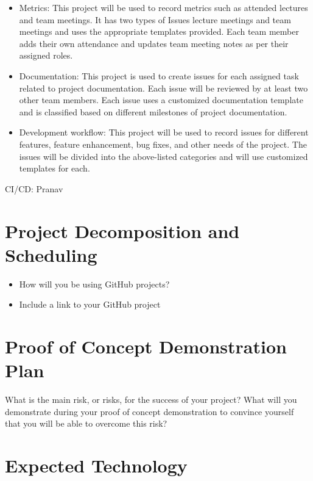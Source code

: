 \documentclass{article}
\begin{document}
\begin{itemize}
\item Metrics: This project will be used to record metrics such as attended lectures and team meetings. It has two types of Issues lecture meetings and team meetings and uses the appropriate templates provided. Each team member adds their own attendance and updates team meeting notes as per their assigned roles.
\item Documentation: This project is used to create issues for each assigned task related to project documentation. Each issue will be reviewed by at least two other team members. Each issue uses a customized documentation template and is classified based on different milestones of project documentation. 
\item Development workflow: This project will be used to record issues for different features, feature enhancement, bug fixes, and other needs of the project. The issues will be divided into the above-listed categories and will use customized templates for each. 
\end{itemize}

CI/CD: Pranav

\section{Project Decomposition and Scheduling}

\begin{itemize}
  \item How will you be using GitHub projects?
  \item Include a link to your GitHub project
\end{itemize}


\section{Proof of Concept Demonstration Plan}

What is the main risk, or risks, for the success of your project?  What will you
demonstrate during your proof of concept demonstration to convince yourself that
you will be able to overcome this risk?

\section{Expected Technology}
\end{document}
